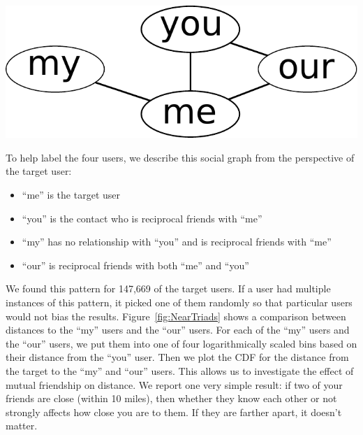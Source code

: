 \documentclass{sig-alternate}
\begin{document}
\begin{center}
\includegraphics[width=0.3\linewidth]{figures/near_triads_dia.pdf}
\end{center}

To help label the four users, we describe this social graph from the
perspective of the target user:

\begin{itemize}
\item ``me'' is the target user
\item ``you'' is the contact who is reciprocal friends with ``me''
\item ``my'' has no relationship with ``you'' and is reciprocal friends with ``me''
\item ``our'' is reciprocal friends with both ``me'' and ``you''
\end{itemize}

We found this pattern for 147,669 of the target users.
%
If a user had multiple instances of this pattern, it picked one of them
randomly so that particular users would not bias the results.
%
%
Figure~\ref{fig:NearTriads} shows a comparison between distances to the ``my''
users and the ``our'' users.
%
For each of the ``my'' users and the ``our'' users, we put them into one of
four logarithmically scaled bins based on their distance from the ``you'' user.
%
Then we plot the CDF for the distance from the target to the ``my'' and ``our'' users.
%
This allows us to investigate the effect of mutual friendship on distance.
We report one very simple result: if two of your friends are close (within 10
miles), then whether they know each other or not strongly affects how close
you are to them.
%
If they are farther apart, it doesn't matter.
\end{document}
